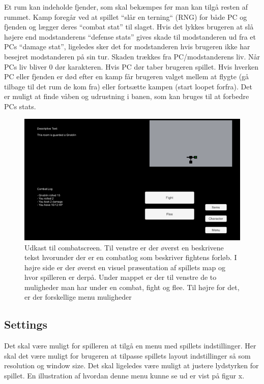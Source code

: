 Et rum kan indeholde fjender, som skal bekæmpes før man kan tilgå resten af rummet. Kamp foregår ved at spillet “slår en terning“ (RNG) for både PC og fjenden og lægger deres “combat stat” til slaget. Hvis det lykkes brugeren at slå højere end modstanderens ``defense stats'' gives skade til modstanderen ud fra et PCs ``damage stat'', ligeledes sker det for modstanderen hvis brugeren ikke har besejret modstanderen på sin tur. Skaden trækkes fra PC/modstanderens liv. Når PCs liv bliver 0 dør karakteren. Hvis PC dør taber brugeren spillet. Hvis hverken PC eller fjenden er død efter en kamp får brugeren valget mellem at flygte (gå tilbage til det rum de kom fra) eller fortsætte kampen (start loopet forfra). 
Det er muligt at finde våben og udrustning i banen, som kan bruges til at forbedre PCs stats. 

\begin{figure}[H]
\centering
\includegraphics[width = \textwidth]{02-Body/Images/CombatScreen-udkast.png}
\caption{Udkast til combatscreen. Til venstre er der øverst en beskrivene tekst hvorunder der er en combatlog som beskriver fightens forløb. I højre side er der øverst en visuel præsentation af spillets map og hvor spilleren er derpå. Under mappet er der til venstre de to muligheder man har under en combat, fight og flee. Til højre for det, er der forskellige menu muligheder}
\label{fig:Combat-udkast}
\end{figure}

\subsection{Settings}
Det skal være muligt for spilleren at tilgå en menu med spillets indstillinger. Her skal det være muligt for brugeren at tilpasse spillets layout indstillinger så som resolution og window size. Det skal ligeledes være muligt at justere lydstyrken for spillet. En illustration af hvordan denne menu kunne se ud er vist på figur x.

